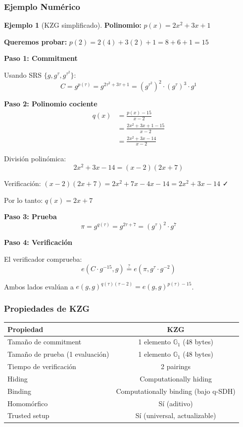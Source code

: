 \documentclass[11pt,a4paper,twoside,openright]{book}
\theoremstyle{definition}
\newtheorem{example}{Ejemplo}[chapter]
\theoremstyle{plain}
\theoremstyle{remark}
\begin{document}
\subsubsection{Ejemplo Numérico}

\begin{example}[KZG simplificado]
\textbf{Polinomio:} $p(x) = 2x^2 + 3x + 1$

\textbf{Queremos probar:} $p(2) = 2(4) + 3(2) + 1 = 8 + 6 + 1 = 15$

\textbf{Paso 1: Commitment}

Usando SRS $\{g, g^\tau, g^{\tau^2}\}$:
\[ C = g^{p(\tau)} = g^{2\tau^2 + 3\tau + 1} = (g^{\tau^2})^2 \cdot (g^\tau)^3 \cdot g^1 \]

\textbf{Paso 2: Polinomio cociente}
\begin{align}
q(x) &= \frac{p(x) - 15}{x - 2} \\
     &= \frac{2x^2 + 3x + 1 - 15}{x - 2} \\
     &= \frac{2x^2 + 3x - 14}{x - 2}
\end{align}

División polinómica:
\[ 2x^2 + 3x - 14 = (x - 2)(2x + 7) \]

Verificación: $(x-2)(2x+7) = 2x^2 + 7x - 4x - 14 = 2x^2 + 3x - 14$ ✓

Por lo tanto: $q(x) = 2x + 7$

\textbf{Paso 3: Prueba}
\[ \pi = g^{q(\tau)} = g^{2\tau + 7} = (g^\tau)^2 \cdot g^7 \]

\textbf{Paso 4: Verificación}

El verificador comprueba:
\[ e(C \cdot g^{-15}, g) \stackrel{?}{=} e(\pi, g^\tau \cdot g^{-2}) \]

Ambos lados evalúan a $e(g,g)^{q(\tau)(\tau-2)} = e(g,g)^{p(\tau)-15}$.
\end{example}

\subsubsection{Propiedades de KZG}

\begin{center}
\begin{tabular}{lc}
\toprule
\textbf{Propiedad} & \textbf{KZG} \\
\midrule
Tamaño de commitment & 1 elemento $\mathbb{G}_1$ (48 bytes) \\
Tamaño de prueba (1 evaluación) & 1 elemento $\mathbb{G}_1$ (48 bytes) \\
Tiempo de verificación & 2 pairings \\
Hiding & Computationally hiding \\
Binding & Computationally binding (bajo q-SDH) \\
Homomórfico & Sí (aditivo) \\
Trusted setup & Sí (universal, actualizable) \\
\bottomrule
\end{tabular}
\end{center}
\end{document}
